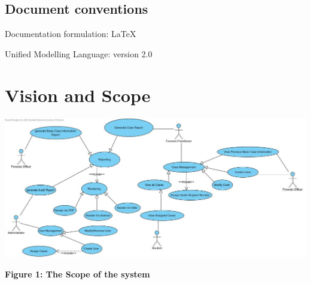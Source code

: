 \documentclass[10pt,a4paper]{article}
\begin{document}
\subsection{Document conventions}
\begin{description}
\item Documentation formulation: LaTeX
\item Unified Modelling Language: version 2.0
\end{description}

\section{Vision and Scope}


\includegraphics[scale=0.4]{DRUC.jpg}
\begin{center}

\textbf{Figure 1: The Scope of the system}
\end{center}
\end{document}
